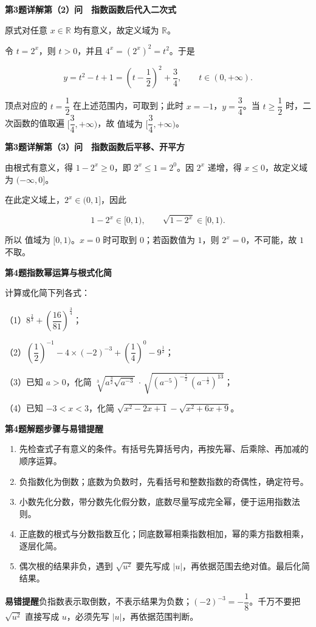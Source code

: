 \documentclass[UTF8,10pt,aspectratio=169]{ctexbeamer}
\newcommand{\PageHeading}[1]{\begin{center}{\Large\bfseries #1}\end{center}\vspace{0.12cm}}
\newcommand{\subq}[1]{\par\vspace{0.15cm}（#1）}
\begin{document}
\begin{frame}[t]
\PageHeading{第3题详解\quad 第（2）问　指数函数后代入二次式}
原式对任意 $x\in\mathbb R$ 均有意义，故定义域为 $\boxed{\mathbb R}$。
\par
\pause
令 $t=2^x$，则 $t>0$，并且 $4^x=(2^x)^2=t^2$。于是
\par
\[y=t^2-t+1=\left(t-\frac12\right)^2+\frac34,\qquad t\in(0,+\infty).\]
\par
顶点对应的 $t=\dfrac12$ 在上述范围内，可取到；此时 $x=-1$，$y=\dfrac34$。当 $t\ge\dfrac12$ 时，二次函数的值取遍 $[\dfrac34,+\infty)$，故 $\boxed{\text{值域为 }[\dfrac34,+\infty)}$。
\par
\end{frame}
\begin{frame}[t]
\PageHeading{第3题详解\quad 第（3）问　指数函数后平移、开平方}
由根式有意义，得 $1-2^x\ge0$，即 $2^x\le1=2^0$。因 $2^x$ 递增，得 $x\le0$，故定义域为 $\boxed{(-\infty,0]}$。
\par
\pause
在此定义域上，$2^x\in(0,1]$，因此
\par
\[1-2^x\in[0,1),\qquad\sqrt{1-2^x}\in[0,1).\]
\par
所以 $\boxed{\text{值域为 }[0,1)}$。$x=0$ 时可取到 $0$；若函数值为 $1$，则 $2^x=0$，不可能，故 $1$ 不取。
\par
\end{frame}
\begin{frame}[t]
\PageHeading{第4题\quad 指数幂运算与根式化简}
计算或化简下列各式：
\subq{1}$8^{\frac23}+\left(\dfrac{16}{81}\right)^{\frac34}$；
\subq{2}$\left(\dfrac12\right)^{-1}-4\times(-2)^{-3}+\left(\dfrac14\right)^0-9^{\frac12}$；
\subq{3}已知 $a>0$，化简 $\sqrt[3]{a^{\frac32}\sqrt{a^{-3}}}\,\cdot\,\sqrt{(a^{-5})^{-\frac12}\,(a^{-\frac12})^{13}}$；
\subq{4}已知 $-3<x<3$，化简 $\sqrt{x^2-2x+1}-\sqrt{x^2+6x+9}$。
\par
\end{frame}
\begin{frame}[t]
\PageHeading{第4题\quad 解题步骤与易错提醒}
\begin{enumerate}\item 先检查式子有意义的条件。有括号先算括号内，再按先幂、后乘除、再加减的顺序运算。
\item 负指数化为倒数；底数为负数时，先看括号和整数指数的奇偶性，确定符号。
\item 小数先化分数，带分数先化假分数，底数尽量写成完全幂，便于运用指数法则。
\item 正底数的根式与分数指数互化；同底数幂相乘指数相加，幂的乘方指数相乘，逐层化简。
\item 偶次根的结果非负，遇到 $\sqrt{u^2}$ 要先写成 $|u|$，再依据范围去绝对值。最后化简结果。\end{enumerate}
\par
\pause
\vspace{0.18cm}\textbf{易错提醒}\quad 负指数表示取倒数，不表示结果为负数；$(-2)^{-3}=-\dfrac18$。千万不要把 $\sqrt{u^2}$ 直接写成 $u$，必须先写 $|u|$，再依据范围判断。
\par
\end{frame}
\end{document}

